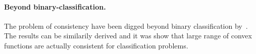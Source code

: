 \paragraph{Beyond binary-classification.} The problem of consistency have been digged beyond binary classification by~\cite{xxx}. The results can be similarily derived and it was show that large range of convex functions are actually consistent for classification problems.








